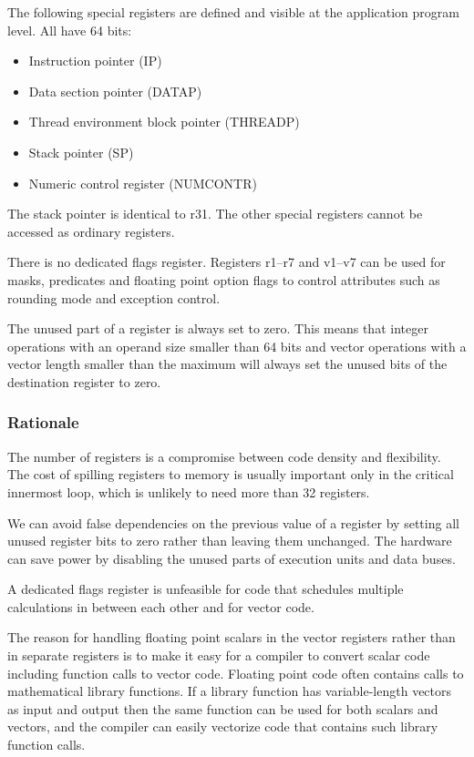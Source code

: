 \documentclass[forwardcom.tex]{subfiles}
\begin{document}
The following special registers are defined and visible at the application program level. All have 64 bits:

\begin{itemize}
\item Instruction pointer (IP)
\item Data section pointer (DATAP)
\item Thread environment block pointer (THREADP)
\item Stack pointer (SP)
\item Numeric control register (NUMCONTR)
\end{itemize}

The stack pointer is identical to r31. The other special registers cannot be accessed as ordinary registers.
\vspace{2mm}

There is no dedicated flags register. Registers r1--r7 and v1--v7 can be used for masks, predicates and floating point option flags to control attributes such as rounding mode and exception control.
\vspace{2mm}

The unused part of a register is always set to zero. This means that integer operations with an operand size smaller than 64 bits and vector operations with a vector length smaller than the maximum will always set the unused bits of the destination register to zero.

\subsubsection{Rationale}
The number of registers is a compromise between code density and flexibility. The cost of spilling registers to memory is usually important only in the critical innermost loop, which is unlikely to need more than 32 registers.
\vspace{2mm}

We can avoid false dependencies on the previous value of a register by setting all unused register bits to zero rather than leaving them unchanged. The hardware can save power by disabling the unused parts of execution units and data buses.
\vspace{2mm}

A dedicated flags register is unfeasible for code that schedules multiple calculations in between each other and for vector code.
\vspace{2mm}

The reason for handling floating point scalars in the vector registers rather than in separate registers is to make it easy for a compiler to convert scalar code including function calls to vector code. Floating point code often contains calls to mathematical library functions. If a library function has variable-length vectors as input and output then the same function can be used for both scalars and vectors, and the compiler can easily vectorize code that contains such library function calls.
\end{document}
